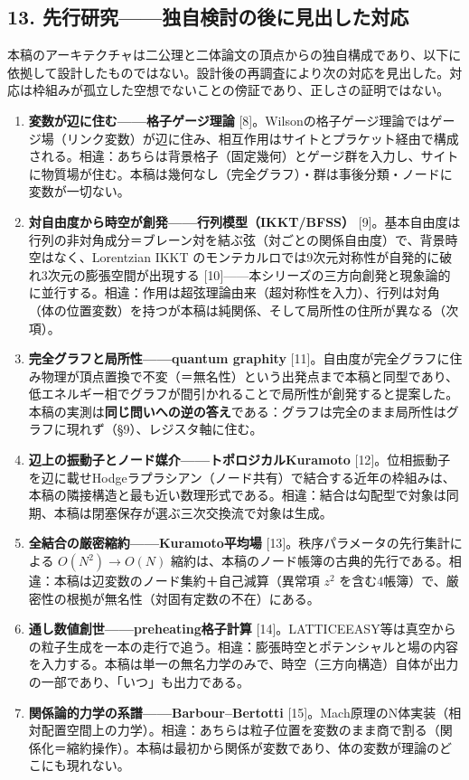 \documentclass[
  a4paper,
]{ltjsarticle}
\providecommand{\tightlist}{%
  \setlength{\itemsep}{0pt}\setlength{\parskip}{0pt}}
\begin{document}
\subsection{13.
先行研究------独自検討の後に見出した対応}\label{ux5148ux884cux7814ux7a76ux72ecux81eaux691cux8a0eux306eux5f8cux306bux898bux51faux3057ux305fux5bfeux5fdc}

本稿のアーキテクチャは二公理と二体論文の頂点からの独自構成であり、以下に依拠して設計したものではない。設計後の再調査により次の対応を見出した。対応は枠組みが孤立した空想でないことの傍証であり、正しさの証明ではない。

\begin{enumerate}
\def\labelenumi{\arabic{enumi}.}
\tightlist
\item
  \textbf{変数が辺に住む------格子ゲージ理論}
  {[}8{]}。Wilsonの格子ゲージ理論ではゲージ場（リンク変数）が辺に住み、相互作用はサイトとプラケット経由で構成される。相違：あちらは背景格子（固定幾何）とゲージ群を入力し、サイトに物質場が住む。本稿は幾何なし（完全グラフ）・群は事後分類・ノードに変数が一切ない。
\item
  \textbf{対自由度から時空が創発------行列模型（IKKT/BFSS）}
  {[}9{]}。基本自由度は行列の非対角成分＝ブレーン対を結ぶ弦（対ごとの関係自由度）で、背景時空はなく、Lorentzian
  IKKT
  のモンテカルロでは9次元対称性が自発的に破れ3次元の膨張空間が出現する
  {[}10{]}------本シリーズの三方向創発と現象論的に並行する。相違：作用は超弦理論由来（超対称性を入力）、行列は対角（体の位置変数）を持つが本稿は純関係、そして局所性の住所が異なる（次項）。
\item
  \textbf{完全グラフと局所性------quantum graphity}
  {[}11{]}。自由度が完全グラフに住み物理が頂点置換で不変（＝無名性）という出発点まで本稿と同型であり、低エネルギー相でグラフが間引かれることで局所性が創発すると提案した。本稿の実測は\textbf{同じ問いへの逆の答え}である：グラフは完全のまま局所性はグラフに現れず（§9）、レジスタ軸に住む。
\item
  \textbf{辺上の振動子とノード媒介------トポロジカルKuramoto}
  {[}12{]}。位相振動子を辺に載せHodgeラプラシアン（ノード共有）で結合する近年の枠組みは、本稿の隣接構造と最も近い数理形式である。相違：結合は勾配型で対象は同期、本稿は閉塞保存が選ぶ三次交換流で対象は生成。
\item
  \textbf{全結合の厳密縮約------Kuramoto平均場}
  {[}13{]}。秩序パラメータの先行集計による \(O(N^2)\to O(N)\)
  縮約は、本稿のノード帳簿の古典的先行である。相違：本稿は辺変数のノード集約＋自己減算（異常項
  \(z^2\)
  を含む4帳簿）で、厳密性の根拠が無名性（対固有定数の不在）にある。
\item
  \textbf{通し数値創世------preheating格子計算}
  {[}14{]}。LATTICEEASY等は真空からの粒子生成を一本の走行で追う。相違：膨張時空とポテンシャルと場の内容を入力する。本稿は単一の無名力学のみで、時空（三方向構造）自体が出力の一部であり、「いつ」も出力である。
\item
  \textbf{関係論的力学の系譜------Barbour--Bertotti}
  {[}15{]}。Mach原理のN体実装（相対配置空間上の力学）。相違：あちらは粒子位置を変数のまま商で割る（関係化＝縮約操作）。本稿は最初から関係が変数であり、体の変数が理論のどこにも現れない。
\end{enumerate}
\end{document}
